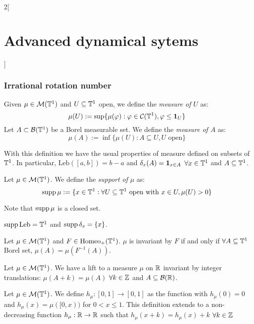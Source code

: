 \documentclass[../../../main_math.tex]{subfiles}
\begin{document}
\begin{multicols}{2}[\section{Advanced dynamical sytems}]
  \subsubsection{Irrational rotation number}
  \begin{definition}
    Given $\mu\in \mathcal{M}(\mathbb{T}^1)$ and $U\subseteq \mathbb{T}^1$ open, we define the \emph{measure of $U$} as:
    $$
      \mu(U):=\sup\{\mu(\varphi):\varphi\in\mathcal{C}(\mathbb{T}^1),\varphi\leq \boldsymbol{\mathrm{1}}_{U}\}
    $$
    Let $A\subset \mathcal{B}(\mathbb{T}^1)$ be a Borel measurable set. We define the \emph{measure of $A$} as:
    $$
      \mu(A):=\inf\{\mu(U):A\subseteq U, U\text{ open}\}
    $$
  \end{definition}
  \begin{remark}
    With this definition we have the usual properties of measure defined on subsets of $\mathbb{T}^1$. In particular, $\text{Leb}([a,b])=b-a$ and $\delta_x(A)=\boldsymbol{\mathrm{1}}_{x\in A}$ $\forall x\in \mathbb{T}^1$ and $A\subseteq \mathbb{T}^1$.
  \end{remark}
  \begin{definition}
    Let $\mu\in \mathcal{M}(\mathbb{T}^1)$. We define the \emph{support of $\mu$} as:
    $$
      \operatorname{supp}\mu:=\{x\in\mathbb{T}^1:\forall U\subseteq \mathbb{T}^1\text{ open with } x\in U,\mu(U)>0\}
    $$
  \end{definition}
  \begin{remark}
    Note that $\operatorname{supp}\mu $ is a closed set.
  \end{remark}
  \begin{remark}
    $\operatorname{supp}\text{Leb}=\mathbb{T}^1$ and $\operatorname{supp}\delta_{x}=\{x\}$.
  \end{remark}
  \begin{proposition}
    Let $\mu\in \mathcal{M}(\mathbb{T}^1)$ and $F\in\mathrm{Homeo}_+(\mathbb{T}^1)$. $\mu$ is invariant by $F$ if and only if $\forall A\subseteq \mathbb{T}^1$ Borel set, $\mu(A)=\mu(F^{-1}(A))$.
  \end{proposition}
  \begin{lemma}
    Let $\mu\in \mathcal{M}(\mathbb{T}^1)$. We have a lift to a measure $\mu$ on $\mathbb{R}$ invariant by integer translations: $\mu(A+k)=\mu(A)$ $\forall k\in\mathbb{Z}$ and $A\subseteq \mathcal{B}(\mathbb{R})$.
  \end{lemma}
  \begin{definition}
    Let $\mu\in\mathcal{M}(\mathbb{T}^1)$. We define $h_\mu:[0,1]\to [0,1]$ as the function with $h_\mu(0)=0$ and $h_\mu(x)=\mu([0,x))$ for $0<x\leq 1$. This definition extends to a non-decreasing function $h_\mu:\mathbb{R}\to\mathbb{R}$ such that $h_\mu(x+k)=h_\mu(x)+k$ $\forall k\in\mathbb{Z}$
  \end{definition}

\end{multicols}
\end{document}
